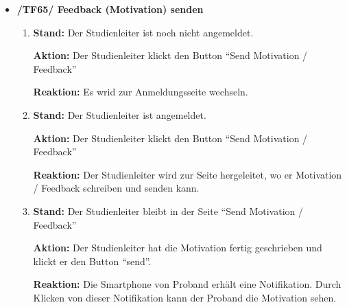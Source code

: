 \documentclass[a4paper]{scrreprt}
\begin{document}
\begin{itemize}
                \item \textbf{/TF65/ Feedback (Motivation) senden}

                    \begin{enumerate}
                        \item \par \textbf{Stand: } Der \gls{Studienleiter} ist noch nicht angemeldet.
                              \par \textbf{Aktion: } Der \gls{Studienleiter} klickt den Button ``Send Motivation / Feedback''
                              \par \textbf{Reaktion: } Es wrid zur Anmeldungsseite wechseln.
                        \item \par \textbf{Stand: } Der \gls{Studienleiter} ist angemeldet.
                              \par \textbf{Aktion: }  Der \gls{Studienleiter} klickt den Button ``Send Motivation / Feedback''
                              \par \textbf{Reaktion: } Der \gls{Studienleiter} wird zur Seite hergeleitet, wo er Motivation / Feedback schreiben und senden kann.
                        \item \par \textbf{Stand: } Der \gls{Studienleiter} bleibt in der Seite ``Send Motivation / Feedback''
                              \par \textbf{Aktion: } Der \gls{Studienleiter} hat die Motivation fertig geschrieben und klickt er den Button ``send''.
                              \par \textbf{Reaktion: } Die Smartphone von \gls{Proband} erh\"alt eine Notifikation. Durch Klicken von dieser Notifikation kann der \gls{Proband} die Motivation sehen.
                    \end{enumerate}



\end{itemize}
\end{document}
